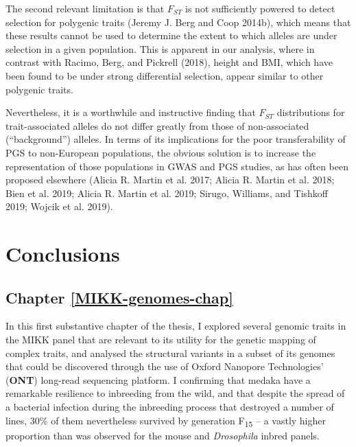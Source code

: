 \documentclass[
]{book}
\begin{document}
The second relevant limitation is that \(F_{ST}\) is not sufficiently powered to detect selection for polygenic traits (Jeremy J. Berg and Coop 2014b), which means that these results cannot be used to determine the extent to which alleles are under selection in a given population. This is apparent in our analysis, where in contrast with Racimo, Berg, and Pickrell (2018), height and BMI, which have been found to be under strong differential selection, appear similar to other polygenic traits.

Nevertheless, it is a worthwhile and instructive finding that \(F_{ST}\) distributions for trait-associated alleles do not differ greatly from those of non-associated (``background'') alleles. In terms of its implications for the poor transferability of PGS to non-European populations, the obvious solution is to increase the representation of those populations in GWAS and PGS studies, as has often been proposed elsewhere (Alicia R. Martin et al. 2017; Alicia R. Martin et al. 2018; Bien et al. 2019; Alicia R. Martin et al. 2019; Sirugo, Williams, and Tishkoff 2019; Wojcik et al. 2019).

\hypertarget{conclusions}{%
\chapter*{Conclusions}\label{conclusions}}

\hypertarget{chapter-refmikk-genomes-chap}{%
\section*{Chapter \ref{MIKK-genomes-chap}}\label{chapter-refmikk-genomes-chap}}

In this first substantive chapter of the thesis, I explored several genomic traits in the MIKK panel that are relevant to its utility for the genetic mapping of complex traits, and analysed the structural variants in a subset of its genomes that could be discovered through the use of Oxford Nanopore Technologies' (\textbf{ONT}) long-read sequencing platform. I confirming that medaka have a remarkable resilience to inbreeding from the wild, and that despite the spread of a bacterial infection during the inbreeding process that destroyed a number of lines, 30\% of them nevertheless survived by generation F\textsubscript{15} -- a vastly higher proportion than was observed for the mouse and \emph{Drosophila} inbred panels.
\end{document}

